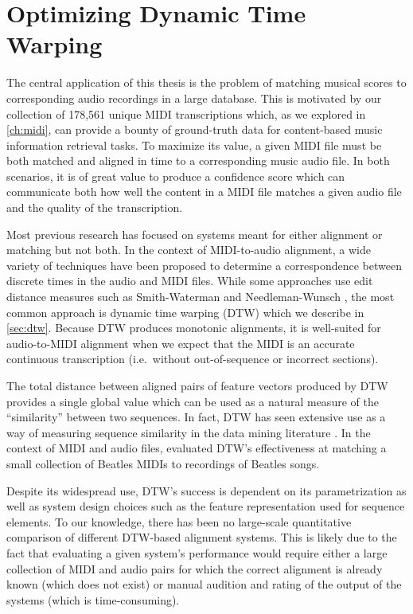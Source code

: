 \chapter{Optimizing Dynamic Time Warping}
\label{ch:dtw}

The central application of this thesis is the problem of matching musical scores to corresponding audio recordings in a large database.
This is motivated by our collection of 178,561 unique MIDI transcriptions which, as we explored in \cref{ch:midi}, can provide a bounty of ground-truth data for content-based music information retrieval tasks.
To maximize its value, a given MIDI file must be both matched and aligned in time to a corresponding music audio file.
In both scenarios, it is of great value to produce a confidence score which can communicate both how well the content in a MIDI file matches a given audio file and the quality of the transcription.

Most previous research has focused on systems meant for either alignment or matching but not both.
In the context of MIDI-to-audio alignment, a wide variety of techniques have been proposed to determine a correspondence between discrete times in the audio and MIDI files.
While some approaches use edit distance measures such as Smith-Waterman \cite{ewert2012towards} and Needleman-Wunsch \cite{grachten2013automatic}, the most common approach is dynamic time warping (DTW) which we describe in \cref{sec:dtw}.
Because DTW produces monotonic alignments, it is well-suited for audio-to-MIDI alignment when we expect that the MIDI is an accurate continuous transcription (i.e.\ without out-of-sequence or incorrect sections).

The total distance between aligned pairs of feature vectors produced by DTW provides a single global value which can be used as a natural measure of the ``similarity'' between two sequences.
In fact, DTW has seen extensive use as a way of measuring sequence similarity in the data mining literature \cite{berndt1994using}.
In the context of MIDI and audio files, \cite{hu2003polyphonic} evaluated DTW's effectiveness at matching a small collection of Beatles MIDIs to recordings of Beatles songs.

Despite its widespread use, DTW's success is dependent on its parametrization as well as system design choices such as the feature representation used for sequence elements.
To our knowledge, there has been no large-scale quantitative comparison of different DTW-based alignment systems.
This is likely due to the fact that evaluating a given system's performance would require either a large collection of MIDI and audio pairs for which the correct alignment is already known (which does not exist) or manual audition and rating of the output of the systems (which is time-consuming).

